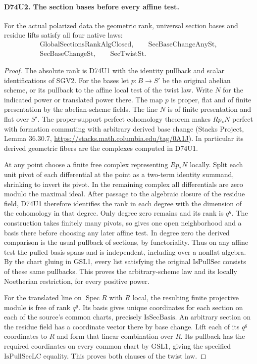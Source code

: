 \paragraph{D74U2. The section bases before every affine test.}
\label{claim:D74U2}
For the actual polarized data the geometric rank,
universal section bases and residue lifts satisfy all four native laws:
\[
 \begin{gathered}
 \mathrm{GlobalSectionsRankAlgClosed},\qquad \mathrm{SecBaseChangeAnySt},\\
 \mathrm{SecBaseChangeSt},\qquad \mathrm{SecTwistSt}.
 \end{gathered}
\]

\begin{proof}
The absolute rank is D74U1 with the identity pullback and scalar
identifications of SGV2. For the bases let $p:B\to S'$ be the
original abelian scheme, or its pullback to the affine local test
of the twist law. Write $N$ for the indicated power or translated
power there. The map $p$ is proper, flat and of finite presentation
by the abelian-scheme fields. The line $N$ is of finite presentation
and flat over $S'$. The proper-support perfect cohomology theorem
makes $Rp_*N$ perfect with formation commuting with arbitrary derived
base change (Stacks Project, Lemma 36.30.7,
\url{https://stacks.math.columbia.edu/tag/0A1J}).
In particular its derived geometric fibers are the complexes computed
in D74U1.

At any point choose a finite free complex representing $Rp_*N$
locally. Split each unit pivot of each differential at the point as
a two-term identity summand, shrinking to invert its pivot. In the
remaining complex all differentials are zero modulo the maximal ideal.
After passage to the algebraic closure of the residue field, D74U1
therefore identifies the rank in each degree with the dimension of
the cohomology in that degree. Only degree zero remains and its rank
is $q^g$. The construction takes finitely many pivots, so gives one
open neighborhood and a basis there before choosing any later
affine test. In degree zero the derived comparison is the usual
pullback of sections, by functoriality. Thus on any affine test the
pulled basis spans and is independent, including over a nonflat
algebra. By the chart gluing in GSL1, every list satisfying the
original $\mathrm{IsPullSec}$ consists of these same pullbacks.
This proves the arbitrary-scheme law and its locally Noetherian
restriction, for every positive power.

For the translated line on $\operatorname{Spec}R$ with $R$ local,
the resulting finite projective module is free of rank $q^g$. Its
basis gives unique coordinates for each section on each of the
source's common charts, precisely $\mathrm{IsSecBasis}$. An arbitrary
section on the residue field has a coordinate vector there by base
change. Lift each of its $q^g$ coordinates to $R$ and form that
linear combination over $R$. Its pullback has the required
coordinates on every common chart by GSL1, giving the specified
$\mathrm{IsPullSecLC}$ equality. This proves both clauses of the
twist law.
\end{proof}

